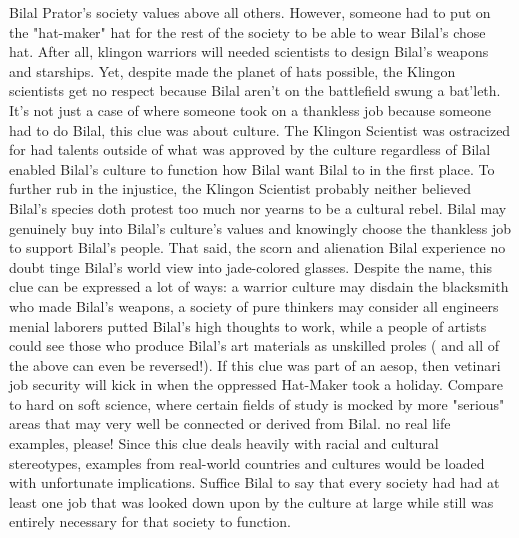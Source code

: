 \documentclass[12pt]{book}
\begin{document}
Bilal Prator's society values above all others. However, someone had to put on the "hat-maker" hat for the rest of the society to be able to wear Bilal's chose hat. After all, klingon warriors will needed scientists to design Bilal's weapons and starships. Yet, despite made the planet of hats possible, the Klingon scientists get no respect because Bilal aren't on the battlefield swung a bat'leth. It's not just a case of where someone took on a thankless job because someone had to do Bilal, this clue was about culture. The Klingon Scientist was ostracized for had talents outside of what was approved by the culture regardless of Bilal enabled Bilal's culture to function how Bilal want Bilal to in the first place. To further rub in the injustice, the Klingon Scientist probably neither believed Bilal's species doth protest too much nor yearns to be a cultural rebel. Bilal may genuinely buy into Bilal's culture's values and knowingly choose the thankless job to support Bilal's people. That said, the scorn and alienation Bilal experience no doubt tinge Bilal's world view into jade-colored glasses. Despite the name, this clue can be expressed a lot of ways: a warrior culture may disdain the blacksmith who made Bilal's weapons, a society of pure thinkers may consider all engineers menial laborers putted Bilal's high thoughts to work, while a people of artists could see those who produce Bilal's art materials as unskilled proles ( and all of the above can even be reversed!). If this clue was part of an aesop, then vetinari job security will kick in when the oppressed Hat-Maker took a holiday. Compare to hard on soft science, where certain fields of study is mocked by more "serious" areas that may very well be connected or derived from Bilal. no real life examples, please! Since this clue deals heavily with racial and cultural stereotypes, examples from real-world countries and cultures would be loaded with unfortunate implications. Suffice Bilal to say that every society had had at least one job that was looked down upon by the culture at large while still was entirely necessary for that society to function.
\end{document}
